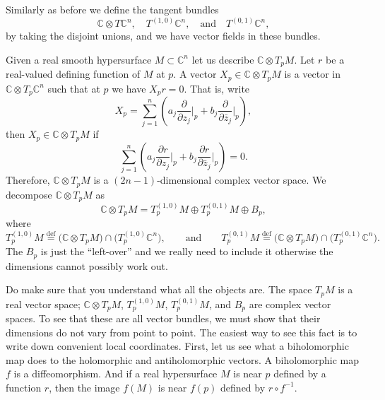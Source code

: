 \documentclass[12pt,openany]{book}
\newcommand{\C}{{\mathbb{C}}}
\theoremstyle{plain}
\theoremstyle{remark}
\theoremstyle{definition}
\theoremstyle{exercise}
\theoremstyle{example}
\begin{document}
Similarly as before we define the tangent bundles
\begin{equation*}
\C \otimes T\C^n,
\quad
T^{(1,0)} \C^n,
\quad \text{and} \quad
T^{(0,1)} \C^n ,
\end{equation*}
by taking the disjoint unions, and we have vector fields in these bundles.

Given a real smooth hypersurface $M \subset \C^n$ let us describe
$\C \otimes T_pM$.  Let $r$ be a real-valued defining function of
$M$ at $p$.  A vector $X_p \in \C \otimes T_pM$
is a vector in $\C \otimes T_p\C^n$ such that at $p$ we have
$X_p r = 0$.  That is,
write
\begin{equation*}
X_p = \sum_{j=1}^n
\left(
a_j 
\frac{\partial}{\partial z_j} \Big|_p
+
b_j
\frac{\partial}{\partial \bar{z}_j} \Big|_p
\right),
\end{equation*}
then $X_p \in \C \otimes T_p M$
if
\begin{equation*}
 \sum_{j=1}^n
\left(
a_j 
\frac{\partial r}{\partial z_j} \Big|_p
+
b_j
\frac{\partial r}{\partial \bar{z}_j} \Big|_p
\right)
= 0 .
\end{equation*}
Therefore, $\C \otimes T_p M$ is a $(2n-1)$-dimensional complex vector space.
We decompose 
$\C \otimes T_p M$ as
\begin{equation*}
\C \otimes T_pM = 
T_p^{(1,0)} M \oplus T_p^{(0,1)} M \oplus B_p ,
\end{equation*}
where
\begin{equation*}
T_p^{(1,0)} M \overset{\text{def}}{=} \bigl( \C \otimes T_pM \bigr) \cap
\bigl( T_p^{(1,0)} \C^n \bigr),  \qquad \text{and}
\qquad
T_p^{(0,1)} M \overset{\text{def}}{=} \bigl( \C \otimes T_pM \bigr) \cap
\bigl( T_p^{(0,1)} \C^n \bigr) .
\end{equation*}
The $B_p$ is just the ``left-over'' and we really need to
include it otherwise the dimensions cannot possibly work out.

Do make sure that you understand what all the objects are.  The space
$T_pM$ is a real vector space; $\C \otimes T_pM$, $T_p^{(1,0)}M$,
$T_p^{(0,1)} M$, and $B_p$ are complex vector spaces.  To see that
these are all vector bundles, we must show that their dimensions do not vary
from point to point.  The easiest way to see this fact is to write down
convenient local coordinates.  First, let us see what a biholomorphic map
does to the holomorphic and antiholomorphic vectors.  A biholomorphic map
$f$ is a diffeomorphism.  And if a real hypersurface $M$ is near $p$ defined
by a function $r$, then the image $f(M)$ is near $f(p)$ defined by
$r \circ f^{-1}$.
\end{document}
